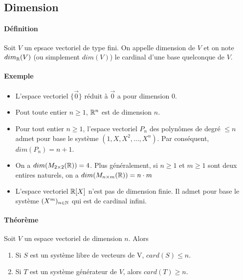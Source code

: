 %
\subsection{Dimension}
%
\paragraph{Définition} Soit $V$ un epsace vectoriel de type fini. On appelle dimension de $V$ et on note $dim_{\mathbb{R}}(V)$ (ou simplement $dim(V)$) le cardinal d'une base quelconque de $V$.
\paragraph{Exemple}
\begin{itemize}
  \item L'espace vectoriel $\{ \vec{0} \}$ réduit à $\vec{0}$ a pour dimension $0$.
  \item Pout toute entier $n \geq 1$, $\mathbb{R}^n$ est de dimension $n$.
  \item Pour tout entier $n \geq 1$, l'espace vectoriel $P_n$ des polynômes de degré $\leq n$ admet pour base le système $(1, X, X^2, \ldots, X^n)$. Par conséquent, $dim(P_n) = n+1$.
  \item On a $dim(M_{2\times 2}(\mathbb{R}) ) = 4$. Plus généralement, si $n \geq 1$ et $m \geq 1$ sont deux entires naturels, on a $dim( M_{n\times m}(\mathbb{R}) ) = n\cdot m$
  \item L'espace vectoriel $\mathbb{R}[X]$ n'est pas de dimension finie. Il admet pour base le système $(X^m)_{n \in \mathbb{N}}$ qui est de cardinal infini. %
\end{itemize}

\paragraph{Théorème} Soit $V$ un espace vectoriel de dimension $n$. Alors 
\begin{enumerate}
  \item Si $S$ est un système libre de vecteurs de V,  $card(S) \leq n$.
  \item Si $T$ est un système générateur de $V$, alors $card(T) \geq n$.
\end{enumerate}


